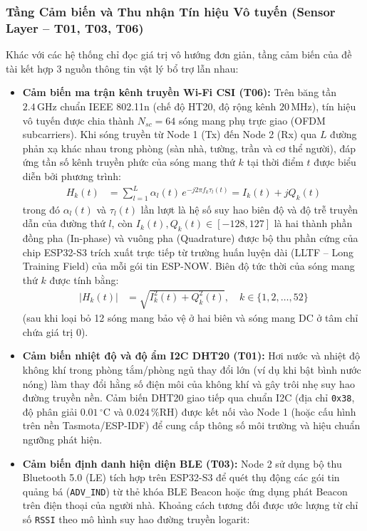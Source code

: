 \documentclass{hcmut-report}
\begin{document}
\subsubsection[Tầng Cảm biến và Vô tuyến (T01, T03, T06)]{Tầng Cảm biến và Thu nhận Tín hiệu Vô tuyến (Sensor Layer -- T01, T03, T06)}
Khác với các hệ thống chỉ đọc giá trị vô hướng đơn giản, tầng cảm biến của đề tài kết hợp 3 nguồn thông tin vật lý bổ trợ lẫn nhau:
\begin{itemize}
  \item \textbf{Cảm biến ma trận kênh truyền Wi-Fi CSI (\textbf{T06}):} Trên băng tần $2.4\,\text{GHz}$ chuẩn IEEE 802.11n (chế độ HT20, độ rộng kênh $20\,\text{MHz}$), tín hiệu vô tuyến được chia thành $N_{sc} = 64$ sóng mang phụ trực giao (OFDM subcarriers). Khi sóng truyền từ Node 1 (Tx) đến Node 2 (Rx) qua $L$ đường phản xạ khác nhau trong phòng (sàn nhà, tường, trần và cơ thể người), đáp ứng tần số kênh truyền phức của sóng mang thứ $k$ tại thời điểm $t$ được biểu diễn bởi phương trình:
  \begin{align}
    H_k(t) &= \sum_{l=1}^{L} \alpha_l(t) \, e^{-j 2\pi f_k \tau_l(t)} = I_k(t) + j Q_k(t) \label{eq:csi_channel}
  \end{align}
  trong đó $\alpha_l(t)$ và $\tau_l(t)$ lần lượt là hệ số suy hao biên độ và độ trễ truyền dẫn của đường thứ $l$, còn $I_k(t), Q_k(t) \in [-128, 127]$ là hai thành phần đồng pha (In-phase) và vuông pha (Quadrature) được bộ thu phần cứng của chip ESP32-S3 trích xuất trực tiếp từ trường huấn luyện dài (LLTF -- Long Training Field) của mỗi gói tin ESP-NOW. Biên độ tức thời của sóng mang thứ $k$ được tính bằng:
  \begin{align}
    |H_k(t)| &= \sqrt{I_k^2(t) + Q_k^2(t)}, \quad k \in \{1, 2, \dots, 52\} \label{eq:csi_amp}
  \end{align}
  (sau khi loại bỏ 12 sóng mang bảo vệ ở hai biên và sóng mang DC ở tâm chỉ chứa giá trị 0).
  \item \textbf{Cảm biến nhiệt độ và độ ẩm I2C DHT20 (\textbf{T01}):} Hơi nước và nhiệt độ không khí trong phòng tắm/phòng ngủ thay đổi lớn (ví dụ khi bật bình nước nóng) làm thay đổi hằng số điện môi của không khí và gây trôi nhẹ suy hao đường truyền nền. Cảm biến DHT20 giao tiếp qua chuẩn I2C (địa chỉ \texttt{0x38}, độ phân giải $0.01\,^\circ\text{C}$ và $0.024\,\%\text{RH}$) được kết nối vào Node 1 (hoặc cấu hình trên nền Tasmota/ESP-IDF) để cung cấp thông số môi trường và hiệu chuẩn ngưỡng phát hiện.
  \item \textbf{Cảm biến định danh hiện diện BLE (\textbf{T03}):} Node 2 sử dụng bộ thu Bluetooth 5.0 (LE) tích hợp trên ESP32-S3 để quét thụ động các gói tin quảng bá (\texttt{ADV\_IND}) từ thẻ khóa BLE Beacon hoặc ứng dụng phát Beacon trên điện thoại của người nhà. Khoảng cách tương đối được ước lượng từ chỉ số \texttt{RSSI} theo mô hình suy hao đường truyền logarit:

\end{itemize}
\end{document}

